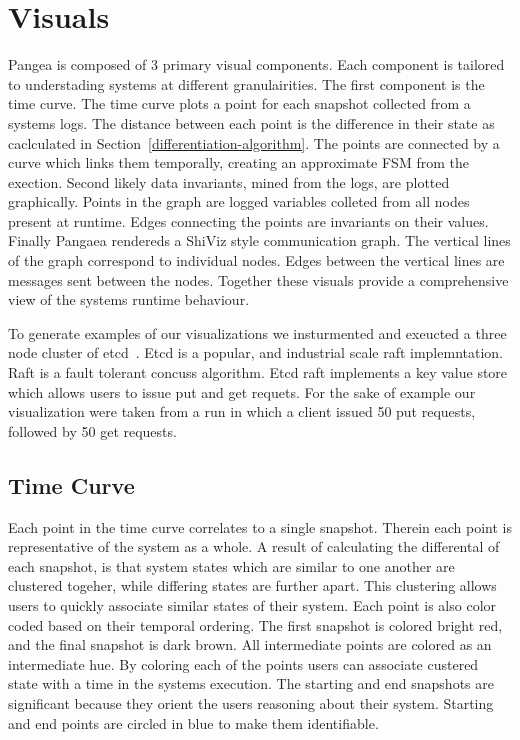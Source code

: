 \section{Visuals}
\label{sec:visuals}

Pangea is composed of 3 primary visual components. Each component is
tailored to understading systems at different granulairities. The
first component is the time curve. The time curve plots a point for
each snapshot collected from a systems logs. The distance between each
point is the difference in their state as caclculated in
Section~\ref{differentiation-algorithm}. The points are connected by a
curve which links them temporally, creating an approximate FSM from
the exection. Second likely data invariants, mined from the logs, are
plotted graphically. Points in the graph are logged variables colleted
from all nodes present at runtime. Edges connecting the points are
invariants on their values. Finally Pangaea rendereds a ShiViz style
communication graph. The vertical lines of the graph correspond to
individual nodes. Edges between the vertical lines are messages sent
between the nodes. Together these visuals provide a comprehensive view
of the systems runtime behaviour.

To generate examples of our visualizations we insturmented and
exeucted a three node cluster of etcd~\cite{etcdraft}. Etcd is a
popular, and industrial scale raft implemntation. Raft is a fault
tolerant concuss algorithm. Etcd raft implements a key value store
which allows users to issue put and get requets. For the sake of
example our visualization were taken from a run in which a client
issued 50 put requests, followed by 50 get requests.

\subsection{Time Curve}


Each point in the time curve correlates to a single snapshot.  Therein
each point is representative of the system as a whole.  A result of
calculating the differental of each snapshot, is that system states
which are similar to one another are clustered togeher, while
differing states are further apart.  This clustering allows users to
quickly associate similar states of their system. Each point is also
color coded based on their temporal ordering. The first snapshot is
colored bright red, and the final snapshot is dark brown. All
intermediate points are colored as an intermediate hue. By coloring
each of the points users can associate custered state with a time in
the systems execution. The starting and end snapshots are significant
because they orient the users reasoning about their system. Starting
and end points are circled in blue to make them identifiable.

